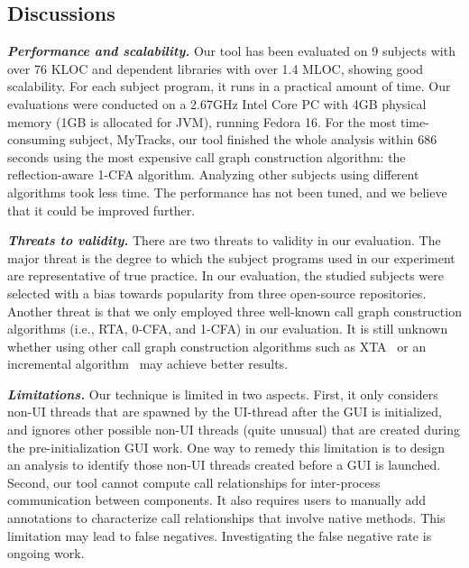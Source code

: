 \subsection{Discussions}

\noindent \textbf{\textit{Performance and scalability.}} Our tool
has been evaluated on 9 subjects with over 76 KLOC and dependent
libraries with over 1.4 MLOC, showing good scalability.
For each subject program, it runs in a practical amount of time. Our evaluations
were conducted on a 2.67GHz Intel Core PC with 4GB
physical memory (1GB is allocated for JVM), running Fedora 16.
For the most time-consuming subject, MyTracks, our tool finished the whole analysis
within 686 seconds using the most expensive call graph construction
algorithm: the reflection-aware 1-CFA algorithm. Analyzing
other subjects using different algorithms took less time.
The performance has not been tuned, and we believe
that it could be improved further.



\vspace{1mm}

\noindent \textbf{\textit{Threats to validity.}}
There are two threats to validity in our evaluation. 
The major threat is the degree to which the subject programs
used in our experiment are representative of true practice.
In our evaluation, the studied subjects were selected with a bias towards popularity from
three open-source repositories. Another threat is that we only employed three
well-known call graph construction algorithms (i.e., RTA, 0-CFA, and 1-CFA) 
in our evaluation. It is still unknown whether using other 
call graph construction algorithms such as XTA~\cite{xta} or
an incremental algorithm~\cite{inccg} may achieve better results.


\vspace{1mm}

\noindent \textbf{\textit{Limitations.}}
Our technique is limited in two aspects. First, it only considers
non-UI threads that are spawned by the UI-thread after the GUI
is initialized, and ignores other possible non-UI threads (quite unusual)
that are created during the pre-initialization GUI work. One way
to remedy this limitation is to design an analysis to identify
those non-UI threads created before a GUI is launched.
Second, our tool cannot compute call relationships
for inter-process communication between components. It also
requires users to manually add annotations to characterize
call relationships that involve native methods. This limitation
may lead to false negatives. Investigating the false negative
rate is ongoing work.

